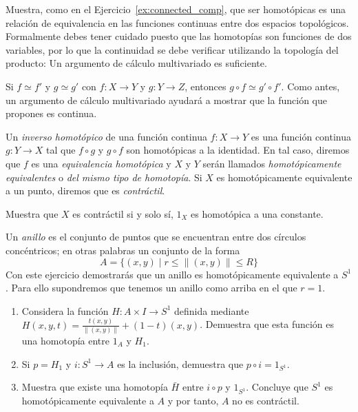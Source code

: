 \documentclass{standalone}
\begin{document}
	\begin{exercise}\label{rem:homotopy_rel_equiv}
		Muestra, como en el Ejercicio~\ref{ex:connected_comp}, que ser homotópicas es una relación de equivalencia en las funciones continuas entre dos espacios topológicos. Formalmente debes tener cuidado puesto que las homotopías son funciones de dos variables, por lo que la continuidad se debe verificar utilizando la topología del producto: Un argumento de cálculo multivariado es suficiente.
	\end{exercise}
	
	\begin{exercise}\label{prop:homotopies_preserve_composition}
		Si $f\simeq f'$ y $g\simeq g'$ con $f\colon X\rightarrow Y$ y $g:Y\rightarrow Z$, entonces $g\circ f\simeq g'\circ f'$. Como antes, un argumento de cálculo multivariado ayudará a mostrar que la función que propones es continua.
	\end{exercise}
		
	
	\begin{definition}\label{defn:homotopy_equivalence}
		Un \emph{inverso homotópico} de una función continua $f:X\rightarrow Y$ es una función continua $g:Y\rightarrow X$ tal que $f\circ g$ y $g\circ f$ son homotópicas a la identidad. En tal caso, diremos que $f$ es una \emph{equivalencia homotópica} y $X$ y $Y$ serán llamados \emph{homotópicamente equivalentes} o \emph{del mismo tipo de homotopía}. Si $X$ es homotópicamente equivalente a un punto, diremos que es \emph{contráctil}.
	\end{definition}
	
	\begin{exercise}
		Muestra que $X$ es contráctil si y solo sí, $1_{X}$ es homotópica a una constante.
	\end{exercise}
	
	\begin{exercise}
		Un \emph{anillo} es el conjunto de puntos que se encuentran entre dos círculos concéntricos; en otras palabras un conjunto de la forma
		\[
		A = \{(x,y) \mid r\leq \|(x,y)\|\leq R\}
		\] Con este ejercicio demostrarás que un anillo es homotópicamente equivalente a $S^{1}$. Para ello supondremos que tenemos un anillo como arriba en el que $r=1$.
		
		\begin{enumerate}
			\item Considera la función $H\colon A\times I\rightarrow S^{1}$ definida mediante $H(x,y, t) = \frac{t(x,y)}{\|(x,y)\|} + (1-t)(x,y)$. Demuestra que esta función es una homotopía entre $1_{A}$ y $H_{1}$. 
			\item Si $p = H_{1}$ y $i\colon S^{1}\rightarrow A$ es la inclusión, demuestra que $p\circ i = 1_{S^{1}}$.
			\item Muestra que existe una homotopía $\bar{H}$ entre $i\circ p$ y $1_{S^{1}}$. Concluye que $S^{1}$ es homotópicamente equivalente a $A$ y por tanto, $A$ no es contráctil.
		\end{enumerate}
	\end{exercise}
	
\end{document}
